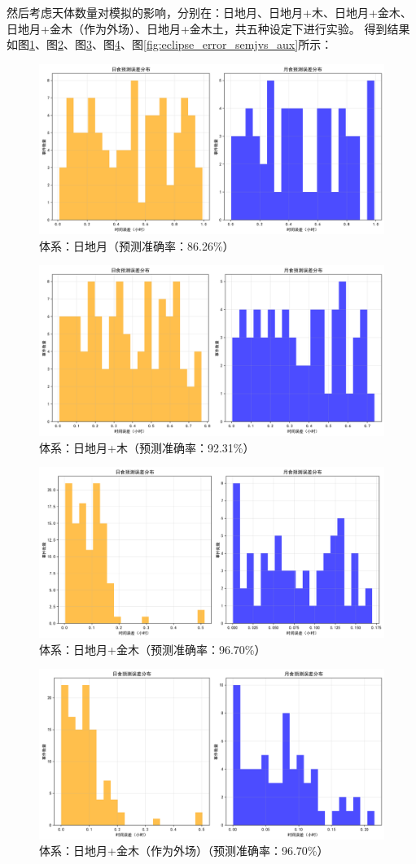 \documentclass[hidelinks]{article}
\begin{document}
然后考虑天体数量对模拟的影响，分别在：日地月、日地月+木、日地月+金木、日地月+金木（作为外场）、日地月+金木土，共五种设定下进行实验。
得到结果如图\ref{fig:eclipse_error_sem}、图\ref{fig:eclipse_error_semj}、图\ref{fig:eclipse_error_semjv}、图\ref{fig:eclipse_error_semjv_aux}、图\ref{fig:eclipse_error_semjvs_aux}所示：
\begin{figure}[h]
    \centering
    \includegraphics[width=0.5\linewidth]{images/error_distribution_sem.png}
    \caption{体系：日地月（预测准确率：86.26\%）}
    \label{fig:eclipse_error_sem}
\end{figure}

\begin{figure}[H]
    \centering
    \includegraphics[width=0.5\linewidth]{images/error_distribution_semj.png}
    \caption{体系：日地月+木（预测准确率：92.31\%）}
    \label{fig:eclipse_error_semj}
\end{figure}

\begin{figure}[H]
    \centering
    \includegraphics[width=0.5\linewidth]{images/error_distribution_1.png}
    \caption{体系：日地月+金木（预测准确率：96.70\%）}
    \label{fig:eclipse_error_semjv}
\end{figure}

\begin{figure}[H]
    \centering
    \includegraphics[width=0.5\linewidth]{images/error_distribution_semjv_aux.png}
    \caption{体系：日地月+金木（作为外场）（预测准确率：96.70\%）}
    \label{fig:eclipse_error_semjv_aux}
\end{figure}
\end{document}

